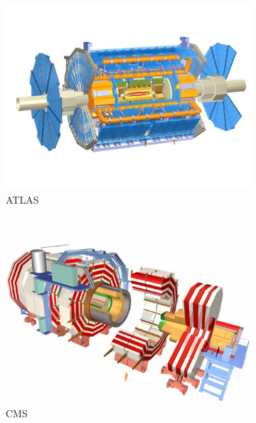 \begin{figure}[h!]
    \centering
    \begin{subfigure}[b]{0.45\textwidth}
        \centering
        \includegraphics[width=\textwidth]{images/ATLAS.jpg}
        \caption{ATLAS}
    \end{subfigure}%
    ~
    \begin{subfigure}[b]{0.45\textwidth}
        \centering
        \includegraphics[width=\textwidth]{images/cms.jpg}
        \caption{ CMS}
    \end{subfigure}
    \\
    \begin{subfigure}[b]{0.45\textwidth}
        \centering

\end{subfigure}
\end{figure}
